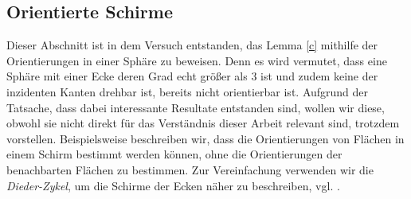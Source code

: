 \documentclass[12pt,titlepage,twoside,cleardoublepage]{article}
\theoremstyle{nummermitklammern}
\numberwithin{equation}{section}
\begin{document}
\subsection{Orientierte Schirme}
Dieser Abschnitt ist in dem Versuch entstanden, das Lemma \ref{c} mithilfe der Orientierungen in einer Sphäre zu beweisen. Denn es wird vermutet, dass eine Sphäre mit einer Ecke deren Grad echt größer als 3 ist und zudem keine der inzidenten Kanten drehbar ist, bereits nicht orientierbar ist. Aufgrund der Tatsache, dass dabei interessante Resultate entstanden sind, wollen wir diese, obwohl sie nicht direkt für das Verständnis dieser Arbeit relevant sind, trotzdem vorstellen. Beispielsweise beschreiben wir, dass die Orientierungen von Flächen in einem Schirm bestimmt werden können, ohne die Orientierungen der benachbarten Flächen zu bestimmen. 
 Zur Vereinfachung verwenden wir die \emph{Dieder-Zykel}, um die Schirme der Ecken näher zu beschreiben, vgl. \cite{simp}.
\end{document}
